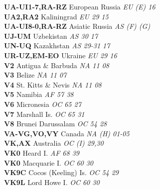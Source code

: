 ﻿\documentclass[landscape,a4paper]{article}
\begin{document}
\begin{multicols}{6}
\textbf{UA-UI1-7,RA-RZ          } European Russia                    \emph{ EU     (E)    16    } \\
\textbf{UA2,RA2                 } Kaliningrad                        \emph{ EU     29     15    } \\
\textbf{UA-UI8-0,RA-RZ          } Asiatic Russia                     \emph{ AS     (F)    (G)   } \\
\textbf{UJ-UM                   } Uzbekistan                         \emph{ AS     30     17    } \\
\textbf{UN-UQ                   } Kazakhstan                         \emph{ AS     29-31  17    } \\
\textbf{UR-UZ,EM-EO             } Ukraine                            \emph{ EU     29     16    } \\
\textbf{V2                      } Antigua \& Barbuda                 \emph{ NA     11     08    } \\
\textbf{V3                      } Belize                             \emph{ NA     11     07    } \\
\textbf{V4                      } St. Kitts \& Nevis                 \emph{ NA     11     08    } \\
\textbf{V5                      } Namibia                            \emph{ AF     57     38    } \\
\textbf{V6                      } Micronesia                         \emph{ OC     65     27    } \\
\textbf{V7                      } Marshall Is.                       \emph{ OC     65     31    } \\
\textbf{V8                      } Brunei Darussalam                  \emph{ OC     54     28    } \\
\textbf{VA-VG,VO,VY             } Canada                             \emph{ NA     (H)    01-05 } \\
\textbf{VK,AX                   } Australia                          \emph{ OC     (I)    29,30 } \\
\textbf{VK0                     } Heard I.                           \emph{ AF     68     39    } \\
\textbf{VK0                     } Macquarie I.                       \emph{ OC     60     30    } \\
\textbf{VK9C                    } Cocos (Keeling) Is.                \emph{ OC     54     29    } \\
\textbf{VK9L                    } Lord Howe I.                       \emph{ OC     60     30    } \\

\end{multicols}
\end{document}
